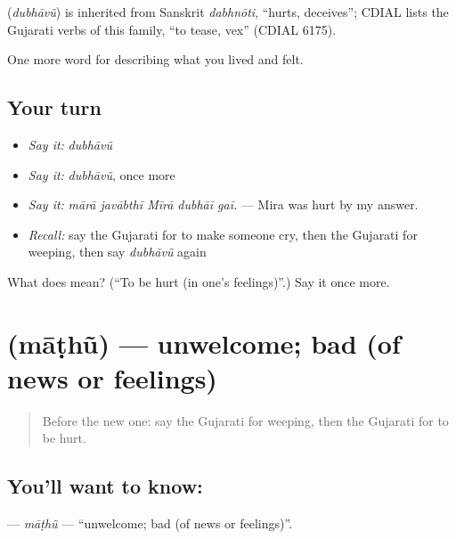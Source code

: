 \begin{cousinweb}
\textbf{} (\emph{dubhāvũ}) is inherited from Sanskrit \emph{dabhnōti}, \textquotedblleft{}hurts, deceives\textquotedblright{}; CDIAL lists the Gujarati verbs of this family, \textquotedblleft{}to tease, vex\textquotedblright{} (CDIAL 6175).
\end{cousinweb}

\begin{grammarlens}[title={What you've built}]
One more word for describing what you lived and felt.
\end{grammarlens}

\subsection*{Your turn}
\begin{itemize}
\raggedright
  \item \emph{Say it:} \emph{dubhāvũ}
  \item \emph{Say it:} \emph{dubhāvũ}, once more
  \item \emph{Say it:} \emph{mārā javābthī Mīrā dubhāī gaī.} — Mira was hurt by my answer.
  \item \emph{Recall:} say the Gujarati for to make someone cry, then the Gujarati for weeping, then say \emph{dubhāvũ} again
\end{itemize}

\begin{tcolorbox}[breakable,colback=teal!4,colframe=teal!35!black,title={Before you move on}]
What does  mean? (\textquotedblleft{}To be hurt (in one's feelings)\textquotedblright{}.) Say it once more.
\end{tcolorbox}
\section[\texorpdfstring{\gu{માઠું} (māṭhũ)}{માઠું (māṭhũ)}]{ (māṭhũ) — unwelcome; bad (of news or feelings)}

\label{lesson:GU-C456-mathu}



\begin{quote}
Before the new one: say the Gujarati for weeping, then the Gujarati for to be hurt.
\end{quote}

\subsection*{You'll want to know: }
\textbf{} — \emph{māṭhũ} — \textquotedblleft{}unwelcome; bad (of news or feelings)\textquotedblright{}.

